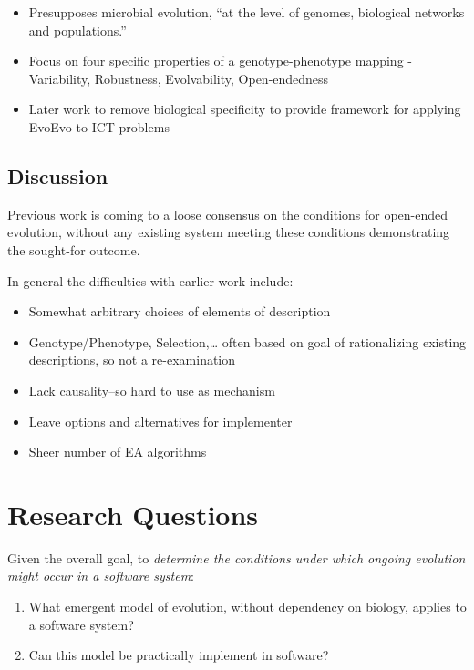 \begin{itemize}
	\item Presupposes microbial evolution, ``at the level of genomes, biological networks and populations.''
	\item Focus on four specific properties of a genotype-phenotype mapping - Variability, Robustness, Evolvability, Open-endedness
	\item Later work to remove biological specificity to provide framework for applying EvoEvo to ICT problems
\end{itemize}

\subsection{Discussion}

Previous work is coming to a loose consensus on the conditions for open-ended evolution, without any existing system meeting these conditions demonstrating the sought-for outcome.

In general the difficulties with earlier work include:
\begin{itemize}
	\item Somewhat arbitrary choices of elements of description
	\item Genotype/Phenotype, Selection,\ldots{} often based on goal of rationalizing existing descriptions, so not a re-examination
	\item Lack causality--so hard to use as mechanism
	\item Leave options and alternatives for implementer
	\item Sheer number of EA algorithms
\end{itemize}


\section{Research Questions}

Given the overall goal, to \emph{determine the conditions under which ongoing evolution might occur in a software system}:

\vspace{0.3cm}
\begin{minipage}[l]{0.95\textwidth}
	\begin{enumerate}[label=RQ\arabic*:]
		\item What emergent model of evolution, without dependency on biology, applies to a software system?
		\item Can this model be practically implement in software?
	\end{enumerate}
\end{minipage}
\vspace{0.3cm}

